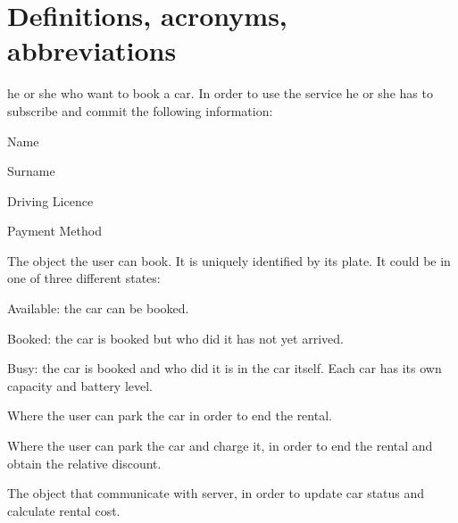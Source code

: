 \section{Definitions, acronyms, abbreviations}
\begin{description}
	\item [User:] he or she who want to book a car. In order to use the service he or she has to subscribe and commit the following information:
		\item Name
		\item Surname
		\item Driving Licence
		\item Payment Method
	\item [Car:] The object the user can book. It is uniquely identified by its plate. It could be in one of three different states:
		\item Available: the car can be booked.
		\item Booked: the car is booked but who did it has not yet arrived.
		\item Busy: the car is booked and who did it is in the car itself.
	Each car has its own capacity and battery level.
	\item [Safe Area:] Where the user can park the car in order to end the rental.
	\item [Power Grid Station:] Where the user can park the car and charge it, in order to end the rental and obtain the relative discount.
	\item [On-Board Computer:] The object that communicate with server, in order to update car status and calculate rental cost.
	
\end{description}
